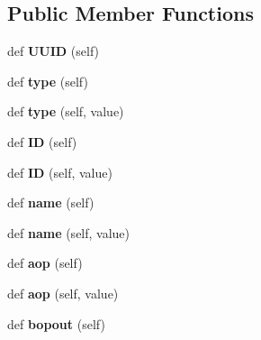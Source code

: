 \subsection*{Public Member Functions}
\begin{DoxyCompactItemize}
\item 
\mbox{\label{class_c_window_1_1_c_window_abbcfc1a774079da020e49c42cbadb693}} 
def {\bfseries U\+U\+ID} (self)
\item 
\mbox{\label{class_c_window_1_1_c_window_aff464267544e4efc9b770c8320c8f199}} 
def {\bfseries type} (self)
\item 
\mbox{\label{class_c_window_1_1_c_window_aca033702f187894894d3102de41d6b99}} 
def {\bfseries type} (self, value)
\item 
\mbox{\label{class_c_window_1_1_c_window_adb8818239148d2e5c5833a2b062ee9ad}} 
def {\bfseries ID} (self)
\item 
\mbox{\label{class_c_window_1_1_c_window_a0a178fbcae3f6431733dd63ee37ac7bb}} 
def {\bfseries ID} (self, value)
\item 
\mbox{\label{class_c_window_1_1_c_window_a5907ca3bbf8e7cd8f40c3007338f6d02}} 
def {\bfseries name} (self)
\item 
\mbox{\label{class_c_window_1_1_c_window_a62d212fdcbbcee30e90a64ce349d32f8}} 
def {\bfseries name} (self, value)
\item 
\mbox{\label{class_c_window_1_1_c_window_a1bc2c7a7aeb532bfa8bf834ec0cfb630}} 
def {\bfseries aop} (self)
\item 
\mbox{\label{class_c_window_1_1_c_window_a7b79dd107f69c89d0b01f7b7a8d41603}} 
def {\bfseries aop} (self, value)
\item 
\mbox{\label{class_c_window_1_1_c_window_a4cb8c39fee6878d719aa6d7e8b6cde39}} 
def {\bfseries bopout} (self)
\item 

\end{DoxyCompactItemize}
